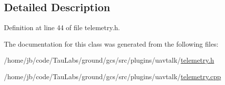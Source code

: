 \subsection{\-Detailed \-Description}


\-Definition at line 44 of file telemetry.\-h.



\-The documentation for this class was generated from the following files\-:\begin{DoxyCompactItemize}
\item 
/home/jb/code/\-Tau\-Labs/ground/gcs/src/plugins/uavtalk/\hyperlink{telemetry_8h}{telemetry.\-h}\item 
/home/jb/code/\-Tau\-Labs/ground/gcs/src/plugins/uavtalk/\hyperlink{telemetry_8cpp}{telemetry.\-cpp}\end{DoxyCompactItemize}
